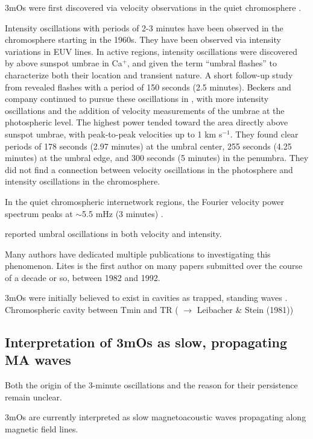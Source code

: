 3mOs were
first discovered via velocity observations in the quiet chromosphere
\citep{Jensen1963}.

Intensity oscillations with periods of 2-3 minutes have been observed in
the chromosphere starting in the 1960s.
They have been observed
via intensity variations in EUV lines.
In active regions, intensity oscillations were discovered by
\cite{Beckers1969} above sunspot umbrae in Ca$^{+}$,
and given the term ``umbral flashes'' to characterize
both their location and transient nature.
A short follow-up study from \cite{Wittmann1969} revealed
flashes with a period of 150 seconds (2.5 minutes).
Beckers and company continued to pursue these oscillations in
\citep{Beckers1972},
with more intensity oscillations and the addition of velocity measurements
of the umbrae at the photospheric level.
The highest power tended toward the area
directly above sunspot umbrae, with peak-to-peak velocities up to
1 km s$^{-1}$.
They found clear periods of
178 seconds (2.97 minutes) at the umbral center,
255 seconds (4.25 minutes) at the umbral edge, and
300 seconds (5 minutes) in the penumbra.
They did not find a connection between velocity oscillations in the photosphere
and intensity oscillations in the chromosphere.

In the quiet chromospheric internetwork regions,
the Fourier velocity power spectrum peaks at
$\sim$5.5 mHz (3 minutes)
\citep{Orrall1966}.

\cite{Giovanelli1972} reported umbral oscillations in both velocity and intensity.

Many authors have dedicated multiple publications to investigating
this phenomenon. Lites is the first author on many papers submitted
over the course of a decade or so, between 1982 and 1992.


3mOs were initially believed to exist in cavities as
trapped, standing waves
\citep{Scheuer1981}.
Chromospheric cavity between Tmin and TR
(\cite{Chae2015}
$\rightarrow$
Leibacher \& Stein (1981))



\subsection{Interpretation of 3mOs as slow, propagating MA waves}

Both the origin of the 3-minute oscillations and the reason for their
persistence remain unclear.

3mOs are currently interpreted as slow
magnetoacoustic waves propagating along magnetic field lines.

